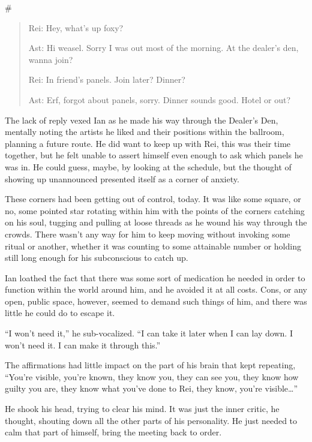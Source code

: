 \documentclass[12pt,letterpaper,oneside]{memoir}
\newcommand\secdiv{
  \begin{center}
    \#
  \end{center}
}
\begin{document}
  \secdiv

  \begin{quotation}
    Rei: Hey, what's up foxy?

    Ast: Hi weasel. Sorry I was out most of the morning. At the dealer's den, wanna join?

    Rei: In friend's panels. Join later? Dinner?

    Ast: Erf, forgot about panels, sorry. Dinner sounds good. Hotel or out?
  \end{quotation}

  The lack of reply vexed Ian as he made his way through the Dealer's Den, mentally noting the artists he liked and their positions within the ballroom, planning a future route. He did want to keep up with Rei, this was their time together, but he felt unable to assert himself even enough to ask which panels he was in. He could guess, maybe, by looking at the schedule, but the thought of showing up unannounced presented itself as a corner of anxiety.

  These corners had been getting out of control, today. It was like some square, or no, some pointed star rotating within him with the points of the corners catching on his soul, tugging and pulling at loose threads as he wound his way through the crowds. There wasn't any way for him to keep moving without invoking some ritual or another, whether it was counting to some attainable number or holding still long enough for his subconscious to catch up.

  Ian loathed the fact that there was some sort of medication he needed in order to function within the world around him, and he avoided it at all costs. Cons, or any open, public space, however, seemed to demand such things of him, and there was little he could do to escape it.

  ``I won't need it,'' he sub-vocalized. ``I can take it later when I can lay down. I won't need it. I can make it through this.''

  The affirmations had little impact on the part of his brain that kept repeating, ``You're visible, you're known, they know you, they can see you, they know how guilty you are, they know what you've done to Rei, they know, you're visible\ldots{}''

  He shook his head, trying to clear his mind.  It was just the inner critic, he thought, shouting down all the other parts of his personality.  He just needed to calm that part of himself, bring the meeting back to order.
\end{document}
